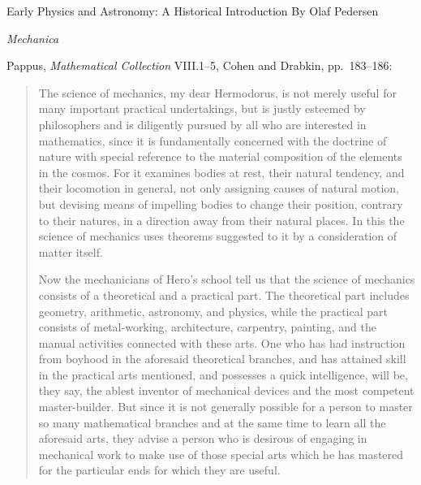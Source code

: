 \documentclass{article}
\begin{document}
Early Physics and Astronomy: A Historical Introduction
By Olaf Pedersen

{\em Mechanica} \cite{aristotleVI}


Pappus, {\em Mathematical Collection} VIII.1--5, Cohen and Drabkin, pp.~183--186:

\begin{quote}
The science of mechanics, my dear Hermodorus, is not merely useful
for many important practical undertakings, but is justly esteemed by
philosophers and is diligently pursued by all who are interested in 
mathematics, since it is fundamentally concerned with the doctrine of nature
with special reference to the material composition of the elements in the
cosmos. For it examines bodies at rest, their natural tendency, and their
locomotion in general, not only assigning causes of natural motion, but
devising means of impelling bodies to change their position, contrary to
their natures, in a direction away from their natural places. In this the
science of mechanics uses theorems suggested to it by a consideration of
matter itself.

Now the mechanicians of Hero's school tell us that the science of
mechanics consists of a theoretical and a practical part. The theoretical
part includes geometry, arithmetic, astronomy, and physics, while the
practical part consists of metal-working, architecture, carpentry, painting,
and the manual activities connected with these arts. One who has had
instruction from boyhood in the aforesaid theoretical branches, and has
attained skill in the practical arts mentioned, and possesses a quick 
intelligence, will be, they say, the ablest inventor of mechanical devices and
the most competent master-builder. But since it is not generally possible
for a person to master so many mathematical branches and at the same
time to learn all the aforesaid arts, they advise a person who is desirous
of engaging in mechanical work to make use of those special arts which he
has mastered for the particular ends for which they are useful.


\end{quote}
\end{document}
